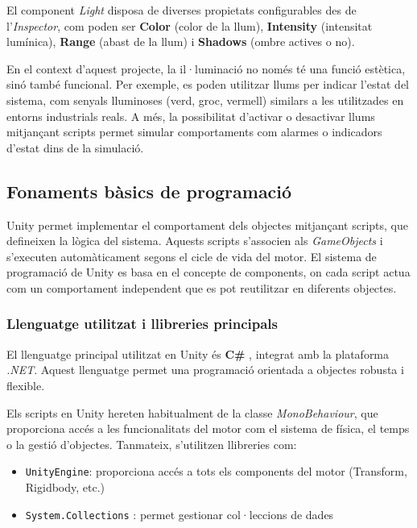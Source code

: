 \documentclass[a4paper,11pt,DIV=13,headings=normal,abstract=true,twoside=semi]{article}
\begin{document}
El component \textit{Light} disposa de diverses propietats configurables des de l'\textit{Inspector}, com poden ser \textbf{Color} (color de la llum), \textbf{Intensity} (intensitat lumínica), \textbf{Range} (abast de la llum) i \textbf{Shadows} (ombre actives o no).

En el context d'aquest projecte, la il·luminació no només té una funció estètica, sinó també funcional. Per exemple, es poden utilitzar llums per indicar l'estat del sistema, com senyals lluminoses (verd, groc, vermell) similars a les utilitzades en entorns industrials reals. A més, la possibilitat d'activar o desactivar llums mitjançant scripts permet simular comportaments com alarmes o indicadors d'estat dins de la simulació.


\subsection{Fonaments bàsics de programació}

Unity permet implementar el comportament dels objectes mitjançant scripts, que defineixen la lògica del sistema. Aquests scripts s'associen als \textit{GameObjects} i s'executen automàticament segons el cicle de vida del motor. El sistema de programació de Unity es basa en el concepte de components, on cada script actua com un comportament independent que es pot reutilitzar en diferents objectes.

\subsubsection{Llenguatge utilitzat i llibreries principals}

El llenguatge principal utilitzat en Unity és \textbf{C\#} \cite{UnityProgrammingGuide}, integrat amb la plataforma \textit{.NET}. Aquest llenguatge permet una programació orientada a objectes robusta i flexible.

Els scripts en Unity hereten habitualment de la classe \textit{MonoBehaviour}, que proporciona accés a les funcionalitats del motor com el sistema de física, el temps o la gestió d'objectes. Tanmateix, s'utilitzen llibreries com:

\begin{itemize}
\item \texttt{UnityEngine}: proporciona accés a tots els components del motor (Transform, Rigidbody, etc.)
\item \texttt{System.Collections} \cite{dotnet_collections}: permet gestionar col·leccions de dades
\end{itemize}
\end{document}
